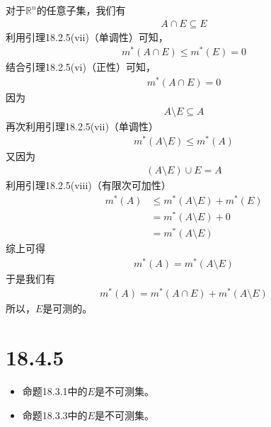 \documentclass{article}
\begin{document}
\begin{itemize}
        对于$\mathbb{R}^n$的任意子集，我们有
        \begin{align*}
          A \cap E \subseteq E
        \end{align*}
        利用引理18.2.5(vii)（单调性）可知，
        \begin{align*}
          m^{\ast}(A \cap E) \leq m^{\ast}(E) = 0
        \end{align*}
        结合引理18.2.5(vi)（正性）可知，
        \begin{align*}
          m^{\ast}(A \cap E) = 0
        \end{align*}
        因为
        \begin{align*}
          A \setminus E \subseteq A
        \end{align*}
        再次利用引理18.2.5(vii)（单调性）
        \begin{align*}
          m^{\ast}(A \setminus E) \leq m^{\ast}(A)
        \end{align*}
        又因为
        \begin{align*}
          (A \setminus E) \cup E = A
        \end{align*}
        利用引理18.2.5(viii)（有限次可加性）
        \begin{align*}
          m^{\ast}(A) & \leq m^{\ast}(A \setminus E) + m^{\ast}(E) \\
                      & = m^{\ast}(A \setminus E) + 0              \\
                      & = m^{\ast}(A \setminus E)
        \end{align*}
        综上可得
        \begin{align*}
          m^{\ast}(A) = m^{\ast}(A \setminus E)
        \end{align*}
        于是我们有
        \begin{align*}
          m^{\ast}(A) = m^{\ast}(A \cap E) + m^{\ast}(A \setminus E)
        \end{align*}
        所以，$E$是可测的。

\end{itemize}

\section*{18.4.5}

\begin{itemize}
  \item 命题18.3.1中的$E$是不可测集。

  

  \item 命题18.3.3中的$E$是不可测集。
\end{itemize}
\end{document}
